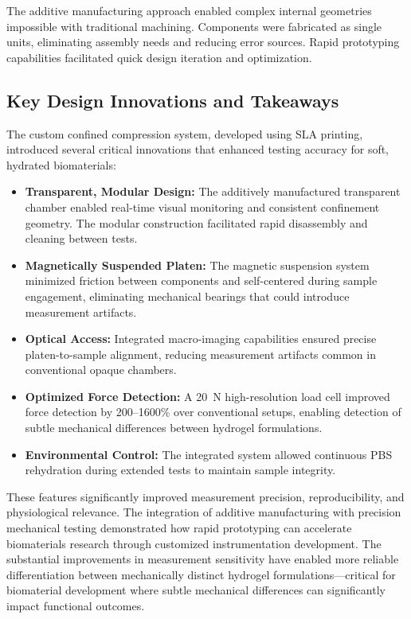 The additive manufacturing approach enabled complex internal geometries impossible with traditional machining. Components were fabricated as single units, eliminating assembly needs and reducing error sources. Rapid prototyping capabilities facilitated quick design iteration and optimization.

\clearpage
\subsection{Key Design Innovations and Takeaways}

The custom confined compression system, developed using SLA printing, introduced several critical innovations that enhanced testing accuracy for soft, hydrated biomaterials:

\begin{itemize}
    \item \textbf{Transparent, Modular Design:} The additively manufactured transparent chamber enabled real-time visual monitoring and consistent confinement geometry. The modular construction facilitated rapid disassembly and cleaning between tests.
    
    \item \textbf{Magnetically Suspended Platen:} The magnetic suspension system minimized friction between components and self-centered during sample engagement, eliminating mechanical bearings that could introduce measurement artifacts.
    
    \item \textbf{Optical Access:} Integrated macro-imaging capabilities ensured precise platen-to-sample alignment, reducing measurement artifacts common in conventional opaque chambers.
    
    \item \textbf{Optimized Force Detection:} A 20~N high-resolution load cell improved force detection by 200--1600\% over conventional setups, enabling detection of subtle mechanical differences between hydrogel formulations.
    
    \item \textbf{Environmental Control:} The integrated system allowed continuous PBS rehydration during extended tests to maintain sample integrity.
\end{itemize}

These features significantly improved measurement precision, reproducibility, and physiological relevance. The integration of additive manufacturing with precision mechanical testing demonstrated how rapid prototyping can accelerate biomaterials research through customized instrumentation development. The substantial improvements in measurement sensitivity have enabled more reliable differentiation between mechanically distinct hydrogel formulations—critical for biomaterial development where subtle mechanical differences can significantly impact functional outcomes.

